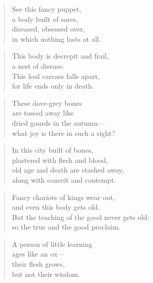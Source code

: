 \documentclass[12pt,openany]{book}%
\begin{document}
\begin{verse}%
See this fancy puppet, \\
a body built of sores, \\
diseased, obsessed over, \\
in which nothing lasts at all. 

%
\end{verse}

\begin{verse}%
This body is decrepit and frail, \\
a nest of disease. \\
This foul carcass falls apart, \\
for life ends only in death. 

%
\end{verse}

\begin{verse}%
These dove-grey bones \\
are tossed away like \\
dried gourds in the autumn—\\
what joy is there in such a sight? 

%
\end{verse}

\begin{verse}%
In this city built of bones, \\
plastered with flesh and blood, \\
old age and death are stashed away, \\
along with conceit and contempt. 

%
\end{verse}

\begin{verse}%
Fancy chariots of kings wear out, \\
and even this body gets old. \\
But the teaching of the good never gets old; \\
so the true and the good proclaim. 

%
\end{verse}

\begin{verse}%
A person of little learning \\
ages like an ox—\\
their flesh grows, \\
but not their wisdom. 

%
\end{verse}
\end{document}
